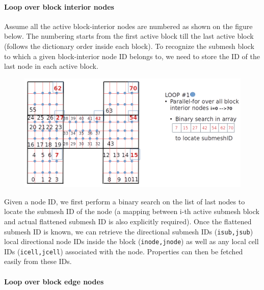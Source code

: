 \documentclass[a4paper,12pt]{article}
\begin{document}
\paragraph{Loop over block interior nodes}
Assume all the active block-interior nodes are numbered as shown on the figure below. The numbering starts from the first active block till the last active block (follows the dictionary order inside each block). To recognize the submesh block to which a given block-interior node ID belongs to, we need to store the ID of the last node in each active block. 
\begin{figure}[H]
	\centering
	\includegraphics[scale=0.4]{figures/BlockInteriorLoop.png}
\end{figure}

Given a node ID, we first perform a binary search on the list of last nodes to locate the submesh ID of the node (a mapping between i-th active submesh block and actual flattened submesh ID is also explicitly required). Once the flattened submesh ID is known, we can retrieve the directional submesh IDs (\texttt{isub,jsub}) local directional node IDs inside the block (\texttt{inode,jnode}) as well as any local cell IDs (\texttt{icell,jcell}) associated with the node. Properties can then be fetched easily from these IDs.

\paragraph{Loop over block edge nodes}  
\end{document}
